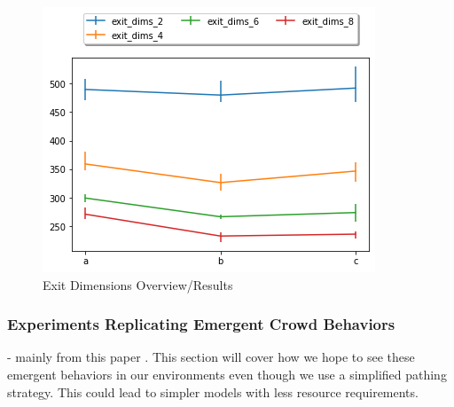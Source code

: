 \documentclass[12pt,letterpaper]{article}
\begin{document}
\begin{figure}
  \includegraphics[width=\linewidth]{./figures/exit_dims_graph.png}
  \caption{Exit Dimensions Overview/Results}
\end{figure}


\subsubsection{Experiments Replicating Emergent Crowd Behaviors}
- mainly from this paper \cite{almeidaCrowdSimulationModeling2013}  .  This section will cover how we hope to see these emergent behaviors in our environments even though we use a simplified pathing strategy.  This could lead to simpler models with less resource requirements.
\end{document}
